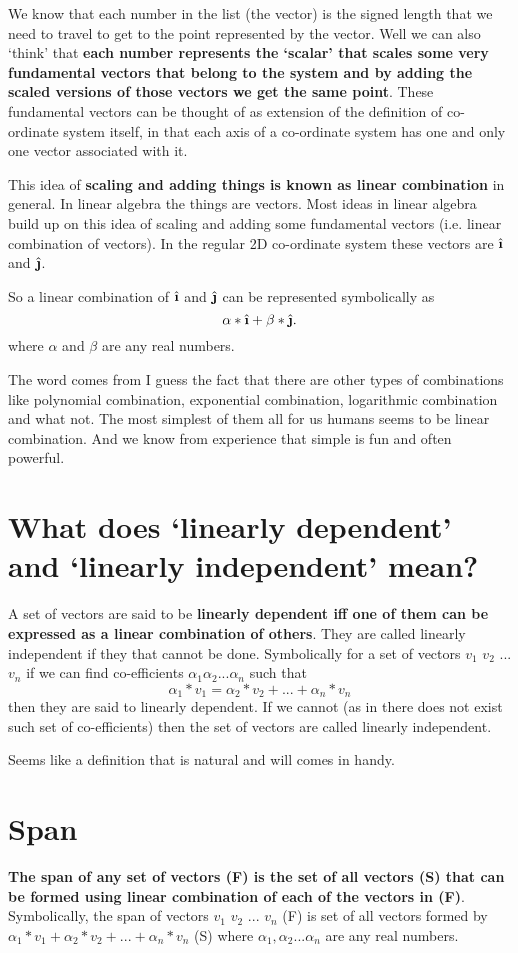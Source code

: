 \documentclass[../main.tex]{subfiles}
\begin{document}
We know that each number in the list (the vector) is the signed length that we need to travel to get to the point represented by the vector.
Well we can also `think' that \textbf{each number represents the `scalar' that scales some very fundamental vectors that belong to the system and by adding the scaled versions of those vectors we get the same point}. These fundamental vectors can be thought of as extension of the definition of co-ordinate system itself, in that each axis of a co-ordinate system has one and only one vector associated with it.

This idea of \textbf{scaling and adding things is known as linear combination} in general. In linear algebra the things are vectors. Most ideas in linear algebra build up on this idea of scaling and adding some fundamental vectors (i.e. linear combination of vectors). In the regular 2D co-ordinate system these vectors are $ \ihat $ and $ \jhat $.

So a linear combination of $ \ihat $ and $ \jhat $ can be represented symbolically as \[
\alpha * \ihat + \beta * \jhat
.\] where $ \alpha $ and $ \beta $ are any real numbers.

The word comes from I guess the fact that there are other types of combinations like polynomial combination, exponential combination, logarithmic combination and what not. The most simplest of them all for us humans seems to be linear combination. And we know from experience that simple is fun and often powerful.


\chapter{What does `linearly dependent' and `linearly independent' mean?}

A set of vectors are said to be \textbf{linearly dependent iff one of them can be expressed as a linear combination of others}. They are called linearly independent if they that cannot be done. Symbolically for a set of vectors $ v_1 $ $ v_2 $ ... $ v_n $ if we can find co-efficients $ \alpha_1 \alpha_2 ... \alpha_n $ such that \[ \alpha_1 * v_1  = \alpha_2 * v_2 + ... + \alpha_n * v_n \] then they are said to linearly dependent. If we cannot (as in there does not exist such set of co-efficients) then the set of vectors are called linearly independent.

Seems like a definition that is natural and will comes in handy.


\chapter{Span}
\textbf{The span of any set of vectors (F) is the set of all vectors (S) that can be formed using linear combination of each of the vectors in (F)}. Symbolically, the span of vectors $ v_1 $ $ v_2 $ ... $ v_n $ (F) is set of all vectors formed by $ \alpha_1 * v_1 + \alpha_2 * v_2 + ... + \alpha_n * v_n $ (S) where $ \alpha_1, \alpha_2 ... \alpha_n $ are any real numbers.
\end{document}
